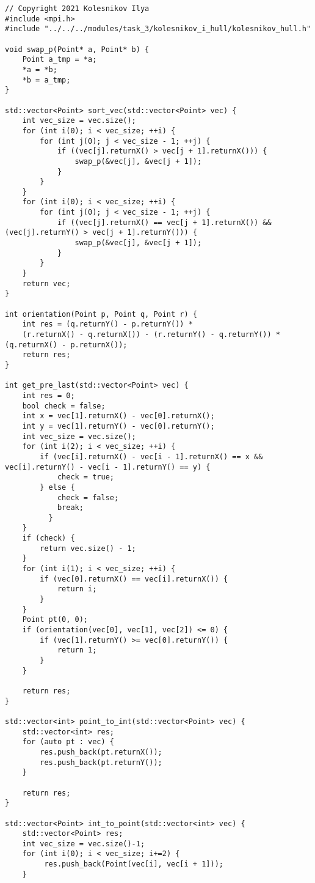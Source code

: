 \documentclass{report}
\begin{document}
\begin{lstlisting}
// Copyright 2021 Kolesnikov Ilya
#include <mpi.h>
#include "../../../modules/task_3/kolesnikov_i_hull/kolesnikov_hull.h"

void swap_p(Point* a, Point* b) {
    Point a_tmp = *a;
    *a = *b;
    *b = a_tmp;
}

std::vector<Point> sort_vec(std::vector<Point> vec) {
    int vec_size = vec.size();
    for (int i(0); i < vec_size; ++i) {
        for (int j(0); j < vec_size - 1; ++j) {
            if ((vec[j].returnX() > vec[j + 1].returnX())) {
                swap_p(&vec[j], &vec[j + 1]);
            }
        }
    }
    for (int i(0); i < vec_size; ++i) {
        for (int j(0); j < vec_size - 1; ++j) {
            if ((vec[j].returnX() == vec[j + 1].returnX()) && (vec[j].returnY() > vec[j + 1].returnY())) {
                swap_p(&vec[j], &vec[j + 1]);
            }
        }
    }
    return vec;
}

int orientation(Point p, Point q, Point r) {
    int res = (q.returnY() - p.returnY()) *
    (r.returnX() - q.returnX()) - (r.returnY() - q.returnY()) * (q.returnX() - p.returnX());
    return res;
}

int get_pre_last(std::vector<Point> vec) {
    int res = 0;
    bool check = false;
    int x = vec[1].returnX() - vec[0].returnX();
    int y = vec[1].returnY() - vec[0].returnY();
    int vec_size = vec.size();
    for (int i(2); i < vec_size; ++i) {
        if (vec[i].returnX() - vec[i - 1].returnX() == x && vec[i].returnY() - vec[i - 1].returnY() == y) {
            check = true;
        } else {
            check = false;
            break;
          }
    }
    if (check) {
        return vec.size() - 1;
    }
    for (int i(1); i < vec_size; ++i) {
        if (vec[0].returnX() == vec[i].returnX()) {
            return i;
        }
    }
    Point pt(0, 0);
    if (orientation(vec[0], vec[1], vec[2]) <= 0) {
        if (vec[1].returnY() >= vec[0].returnY()) {
            return 1;
        }
    }

    return res;
}

std::vector<int> point_to_int(std::vector<Point> vec) {
    std::vector<int> res;
    for (auto pt : vec) {
        res.push_back(pt.returnX());
        res.push_back(pt.returnY());
    }

    return res;
}

std::vector<Point> int_to_point(std::vector<int> vec) {
    std::vector<Point> res;
    int vec_size = vec.size()-1;
    for (int i(0); i < vec_size; i+=2) {
         res.push_back(Point(vec[i], vec[i + 1]));
    }


\end{lstlisting}
\end{document}
